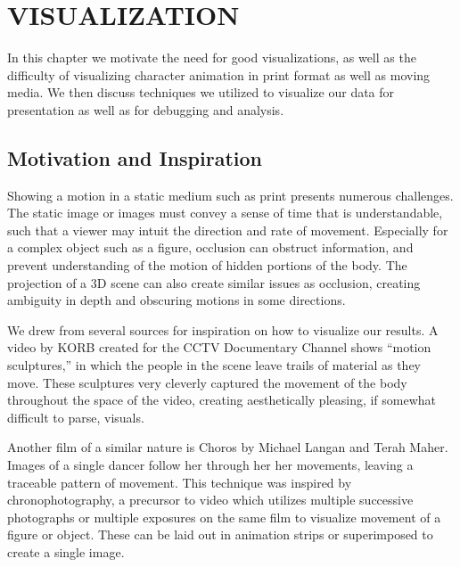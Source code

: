 
 
\chapter{VISUALIZATION}
\label{chapter:visualization}
In this chapter we motivate the need for good visualizations, as well as the difficulty of visualizing character animation in print format as well as moving media.  We then discuss techniques we utilized to visualize our data for presentation as well as for debugging and analysis.

\section{Motivation and Inspiration}
\label{section:vis_insp}
Showing a motion in a static medium such as print presents numerous challenges.  The static image or images must convey a sense of time that is understandable, such that a viewer may intuit the direction and rate of movement.  Especially for a complex object such as a figure, occlusion can obstruct information, and prevent understanding of the motion of hidden portions of the body.  The projection of a 3D scene can also create similar issues as occlusion, creating ambiguity in depth and obscuring motions in some directions.

We drew from several sources for inspiration on how to visualize our results.  A video by KORB created for the CCTV Documentary Channel shows ``motion sculptures,'' in which the people in the scene leave trails of material as they move.  These sculptures very cleverly captured the movement of the body throughout the space of the video, creating aesthetically pleasing, if somewhat difficult to parse, visuals.

Another film of a similar nature is Choros by Michael Langan and Terah Maher.  Images of a single dancer follow her through her her movements, leaving a traceable pattern of movement.  This technique was inspired by chronophotography, a precursor to video which utilizes multiple successive photographs or multiple exposures on the same film to visualize movement of a figure or object.  These can be laid out in animation strips or superimposed to create a single image.

